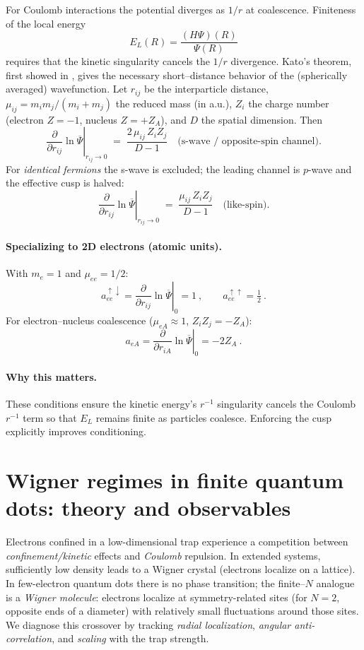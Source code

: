 For Coulomb interactions the potential diverges as $1/r$ at coalescence. Finiteness of the
local energy
\[
E_L(R)=\frac{(H\Psi)(R)}{\Psi(R)}
\]
requires that the kinetic singularity cancels the $1/r$ divergence. Kato’s theorem, first showed in \cite{Kato1957-EigenfunctionsManyParticle}, gives the
necessary short–distance behavior of the (spherically averaged) wavefunction. Let $r_{ij}$ be the
interparticle distance, $\mu_{ij}=m_i m_j/(m_i+m_j)$ the reduced mass (in a.u.), $Z_i$ the charge
number (electron $Z=-1$, nucleus $Z=+Z_A$), and $D$ the spatial dimension. Then
\[
\left.\frac{\partial}{\partial r_{ij}}\ln \overline{\Psi}\right|_{r_{ij}\to 0}
\;=\; \frac{2\,\mu_{ij}\,Z_i Z_j}{D-1}
\quad\text{(s-wave / opposite-spin channel)}.
\]
For \emph{identical fermions} the s-wave is excluded; the leading channel is $p$-wave and the
effective cusp is halved:
\[
\left.\frac{\partial}{\partial r_{ij}}\ln \overline{\Psi}\right|_{r_{ij}\to 0}
\;=\; \frac{\mu_{ij}\,Z_i Z_j}{D-1}
\quad\text{(like-spin)}.
\]

\paragraph{Specializing to 2D electrons (atomic units).}
With $m_e=1$ and $\mu_{ee}=1/2$:
\[
\boxed{\ a_{ee}^{\uparrow\downarrow}=\left.\frac{\partial}{\partial r_{ij}}\ln \overline{\Psi}\right|_{0}=1\ ,\qquad
a_{ee}^{\uparrow\uparrow}=\tfrac12\ .\ }
\]
For electron–nucleus coalescence ($\mu_{eA}\!\approx\!1$, $Z_i Z_j=-Z_A$):
\[
\boxed{\ a_{eA}=\left.\frac{\partial}{\partial r_{iA}}\ln \overline{\Psi}\right|_{0}=-2 Z_A\ .\ }
\]

\paragraph{Why this matters.}
These conditions ensure the kinetic energy’s $r^{-1}$ singularity cancels the Coulomb $r^{-1}$
term so that $E_L$ remains finite as particles coalesce. Enforcing the cusp explicitly improves conditioning.

\section{Wigner regimes in finite quantum dots: theory and observables}
\label{sec:wigner_theory}

Electrons confined in a low-dimensional trap experience a competition between
\emph{confinement/kinetic} effects and \emph{Coulomb} repulsion. In extended
systems, sufficiently low density leads to a Wigner crystal (electrons localize
on a lattice). In few-electron quantum dots there is no phase transition; the
finite--$N$ analogue is a \emph{Wigner molecule}: electrons localize at
symmetry-related sites (for $N{=}2$, opposite ends of a diameter) with
relatively small fluctuations around those sites. We diagnose this crossover by
tracking \emph{radial localization}, \emph{angular anti-correlation}, and
\emph{scaling} with the trap strength.

